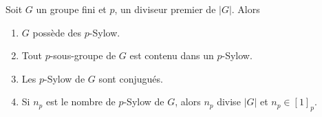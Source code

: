 \begin{theorem}  \label{ThoUkPDXf}
    Soit \( G\) un groupe fini et \( p\), un diviseur premier de \( | G |\). Alors
    \begin{enumerate}
        \item       \label{ITEMooETYHooXlUMQZ}
            \( G\) possède des \( p\)-Sylow.
        \item
            Tout \( p\)-sous-groupe de \( G\) est contenu dans un \( p\)-Sylow.
        \item   \label{ItemMzNRVf}
            Les \( p\)-Sylow de \( G\) sont conjugués.
        \item   \label{ItemkYbdzZ}
            Si \( n_p\) est le nombre de $p$-Sylow de \( G\), alors \( n_p\) divise \( | G |\) et \( n_p\in[1]_p\).
    \end{enumerate}
\end{theorem}

